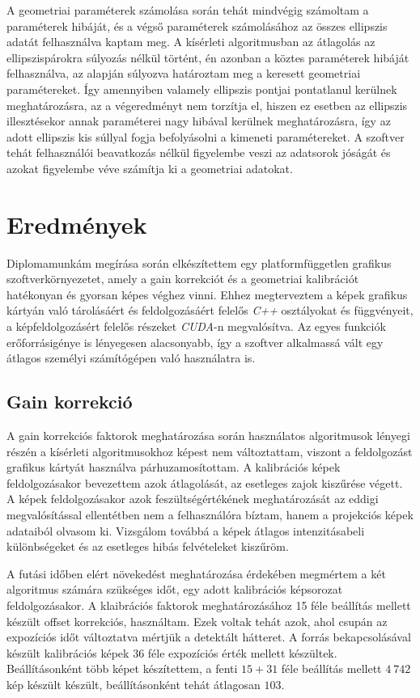 \documentclass[a4paper,12pt]{article}
\begin{document}
A geometriai paraméterek számolása során tehát mindvégig számoltam a paraméterek hibáját, és a végső paraméterek számolásához az összes ellipszis adatát felhasználva kaptam meg. A kísérleti algoritmusban az átlagolás az ellipszispárokra súlyozás nélkül történt, én azonban a köztes paraméterek hibáját felhasználva, az alapján súlyozva határoztam meg a keresett geometriai paramétereket. Így amennyiben valamely ellipszis pontjai pontatlanul kerülnek meghatározásra, az a végeredményt nem torzítja el, hiszen ez esetben az ellipszis illesztésekor annak paraméterei nagy hibával kerülnek meghatározásra, így az adott ellipszis kis súllyal fogja befolyásolni a kimeneti paramétereket. A szoftver tehát felhasználói beavatkozás nélkül figyelembe veszi az adatsorok jóságát és azokat figyelembe véve számítja ki a geometriai adatokat.


\section{Eredmények}

Diplomamunkám megírása során elkészítettem egy platformfüggetlen grafikus szoftverkörnyezetet, amely a gain korrekciót és a geometriai kalibrációt hatékonyan és gyorsan képes véghez vinni. Ehhez megterveztem a képek grafikus kártyán való tárolásáért és feldolgozásáért felelős  \emph{C++} osztályokat és függvényeit, a képfeldolgozásért felelős részeket \emph{CUDA}-n megvalósítva. Az egyes funkciók erőforrásigénye is lényegesen alacsonyabb, így a szoftver alkalmassá vált egy átlagos személyi számítógépen való használatra is. 

\subsection{Gain korrekció}

A gain korrekciós faktorok meghatározása során használatos algoritmusok lényegi részén a kísérleti algoritmusokhoz képest nem változtattam, viszont a feldolgozást grafikus kártyát használva párhuzamosítottam.  A kalibrációs képek feldolgozásakor bevezettem azok átlagolását, az esetleges zajok kiszűrése végett. A képek feldolgozásakor azok feszültségértékének meghatározását az eddigi megvalósítással ellentétben nem a felhasználóra bíztam, hanem a projekciós képek adataiból olvasom ki. Vizsgálom továbbá a képek átlagos intenzitásabeli különbségeket és az esetleges hibás felvételeket kiszűröm.   



A futási időben elért növekedést meghatározása érdekében megmértem a két algoritmus számára szükséges időt, egy adott kalibrációs képsorozat feldolgozásakor. A klaibrációs faktorok meghatározásához 15 féle beállítás mellett készült offset korrekciós, használtam. Ezek voltak tehát azok, ahol csupán az expozíciós időt változtatva mértjük a detektált hátteret. A forrás bekapcsolásával készült kalibrációs képek 36 féle expozíciós érték mellett készültek. Beállításonként több képet készítettem,  a fenti $15+31$ féle beállítás mellett $4~742$ kép készült készült, beállításonként tehát átlagosan $103$. 
\end{document}
